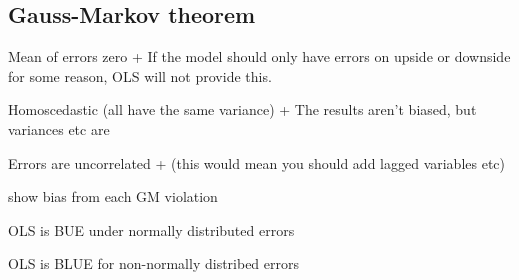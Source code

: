 
\subsection{Gauss-Markov theorem}

Mean of errors zero
+ If the model should only have errors on upside or downside for some reason, OLS will not provide this.

Homoscedastic (all have the same variance)	
+ The results aren’t biased, but variances etc are

Errors are uncorrelated
+ (this would mean you should add lagged variables etc)

show bias from each GM violation

OLS is BUE under normally distributed errors

OLS is BLUE for non-normally distribed errors

